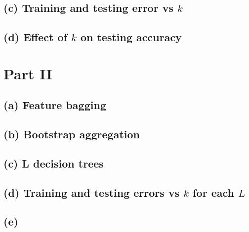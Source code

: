\documentclass{article}
\begin{document}
\subsection{(c) Training and testing error vs $k$}

\subsection{(d) Effect of $k$ on testing accuracy}

\section{Part II}

\subsection{(a) Feature bagging}

\subsection{(b) Bootstrap aggregation}

\subsection{(c) L decision trees}

\subsection{(d) Training and testing errors vs $k$ for each $L$}

\subsection{(e) }
\end{document}
